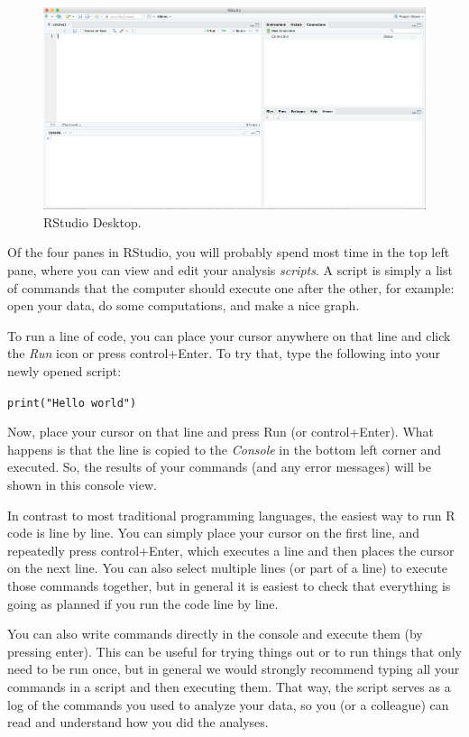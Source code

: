 \begin{figure}
\centering
\includegraphics[width=0.9\linewidth]{figures/ch3_r_studio}
\caption{RStudio Desktop.}
\label{fig:rstudio}
\end{figure}

Of the four panes in RStudio,
you will probably spend most time in the top left pane, where you can view and edit your analysis \emph{scripts}.
A script is simply a list of commands that the computer should execute one after the other,
for example: open your data, do some computations, and make a nice graph. 

To run a line of code, you can place your cursor anywhere on that line and click the \emph{Run} icon or
press control+Enter.
To try that, type the following into your newly opened script:

\verb|print("Hello world")|

Now, place your cursor on that line and press Run (or control+Enter).
What happens is that the line is copied to the \emph{Console} in the bottom left corner
and executed.
So, the results of your commands (and any error messages) will be shown in this console view.

In contrast to most traditional programming languages,
the easiest way to run R code is line by line.
You can simply place your cursor on the first line,
and repeatedly press control+Enter, which executes a line and then places the cursor on the next line.
You can also select multiple lines (or part of a line) to execute those commands together,
but in general it is easiest to check that everything is going as planned if you run the code line by line.

You can also write commands directly in the console and execute them (by pressing enter).
This can be useful for trying things out or to run things that only need to be run once,
but in general we would strongly recommend typing all your commands in a script and then executing them.
That way, the script serves as a log of the commands you used to analyze your data,
so you (or a colleague) can read and understand how you did the analyses. 

